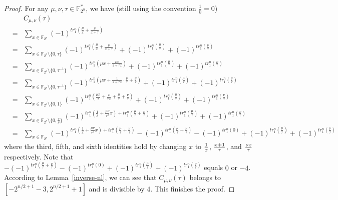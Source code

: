 \documentclass[runningheads,a4paper]{article}
\newtheorem{proof}{Proof}
\newtheorem{lemma}{Lemma}
\newcommand{\F}{\mathbb{F}}
\newcommand{\0}{\textbf{0}}
\newcommand{\1}{\textbf{1}}
\renewcommand{\Tr}{\mathrm{Tr}_1^n}
\begin{document}
    \begin{proof} For any $\mu,\nu,\tau\in\F_{2^n}^*$,
     we have (still using the convention $\frac 10=0$)
    \begin{eqnarray*}
    &&C_{{\mu,\nu}}(\tau)\\
    &=&\sum_{x\in\F_{2^n}}(-1)^{tr_1^n(\frac{\mu}{x}+\frac{\nu}{x+\tau})}\\
    &=&\sum_{x\in\F_{2^n}\setminus\{0,\tau\}}(-1)^{tr_1^n(\frac{\mu}{x}+\frac{\nu}{x+\tau})}+(-1)^{tr_1^n(\frac{\mu}{\tau})}+(-1)^{tr_1^n(\frac{\nu}{\tau})}\\
    &=&\sum_{x\in\F_{2^n}\setminus\{0,\tau^{-1}\}}(-1)^{tr_1^n(\mu x+\frac{\nu x}{1+\tau x})}+(-1)^{tr_1^n(\frac{\mu}{\tau})}+(-1)^{tr_1^n(\frac{\nu}{\tau})}\\
    &=&\sum_{x\in\F_{2^n}\setminus\{0,\tau^{-1}\}}(-1)^{tr_1^n(\mu x+\frac{1}{1+\tau x}\cdot\frac{\nu}{\tau}+\frac{\nu}{\tau})}+(-1)^{tr_1^n(\frac{\mu}{\tau})}+(-1)^{tr_1^n(\frac{\nu}{\tau})}\\
    &=&\sum_{x\in\F_{2^n}\setminus\{0,1\}}(-1)^{tr_1^n(\frac{\mu x}{\tau}+\frac{\nu}{\tau x}+\frac{\mu}{\tau}+\frac{\nu}{\tau})}+(-1)^{tr_1^n(\frac{\mu}{\tau})}+(-1)^{tr_1^n(\frac{\nu}{\tau})}\\
    &=&\sum_{x\in\F_{2^n}\setminus\{0,\frac{\tau}{\nu}\}}(-1)^{tr_1^n(\frac{1}{x}+\frac{\mu \nu}{\tau^2}x)+tr_1^n(\frac{\mu}{\tau}+\frac{\nu}{\tau})}+(-1)^{tr_1^n(\frac{\mu}{\tau})}+(-1)^{tr_1^n(\frac{\nu}{\tau})}\\
    &=&\sum_{x\in\F_{2^n}}(-1)^{tr_1^n(\frac{1}{x}+\frac{\mu \nu}{\tau^2}x)+tr_1^n(\frac{\mu}{\tau}+\frac{\nu}{\tau})}-
    (-1)^{tr_1^n(\frac{\mu}{\tau}+\frac{\nu}{\tau})}-(-1)^{tr_1^n(0)}+(-1)^{tr_1^n(\frac{\mu}{\tau})}+(-1)^{tr_1^n(\frac{\nu}{\tau})}
   \end{eqnarray*}
   where the third, fifth, and sixth identities hold by changing $x$ to ${1\over x}$, ${x+1\over \tau}$, and ${\nu x\over \tau}$ respectively.
   Note that $-(-1)^{tr_1^n(\frac{\mu}{\tau}+\frac{\nu}{\tau})}-(-1)^{tr_1^n(0)}+(-1)^{tr_1^n(\frac{\mu}{\tau})}+(-1)^{tr_1^n(\frac{\nu}{\tau})}$
   equals $0$ or $-4$. According to Lemma~\ref{inverse-nl}, we can see that $C_{{\mu,\nu}}(\tau)$ belongs to $[-2^{{n/2}+1}-3, 2^{{n/2}+1}+1]$ and is divisible by $4$.
   This finishes the proof.
   \end{proof}
\end{document}

